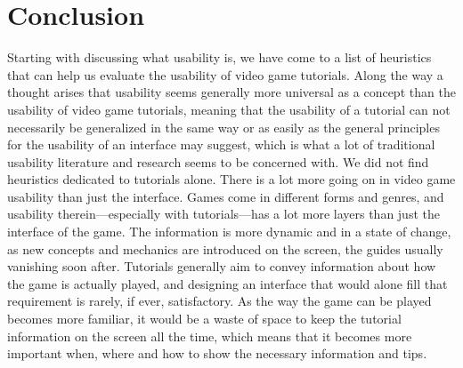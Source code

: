 \chapter{Conclusion}
Starting with discussing what usability is, we have come to a list of heuristics that can help us evaluate the usability of video game tutorials. Along the way a thought arises that usability seems generally more universal as a concept than the usability of video game tutorials, meaning that the usability of a tutorial can not necessarily be generalized in the same way or as easily as the general principles for the usability of an interface may suggest, which is what a lot of traditional usability literature and research seems to be concerned with. We did not find heuristics dedicated to tutorials alone. There is a lot more going on in video game usability than just the interface. Games come in different forms and genres, and usability therein---especially with tutorials---has a lot more layers than just the interface of the game. The information is more dynamic and in a state of change, as new concepts and mechanics are introduced on the screen, the guides usually vanishing soon after. Tutorials generally aim to convey information about how the game is actually played, and designing an interface that would alone fill that requirement is rarely, if ever, satisfactory. As the way the game can be played becomes more familiar, it would be a waste of space to keep the tutorial information on the screen all the time, which means that it becomes more important when, where and how to show the necessary information and tips. 

